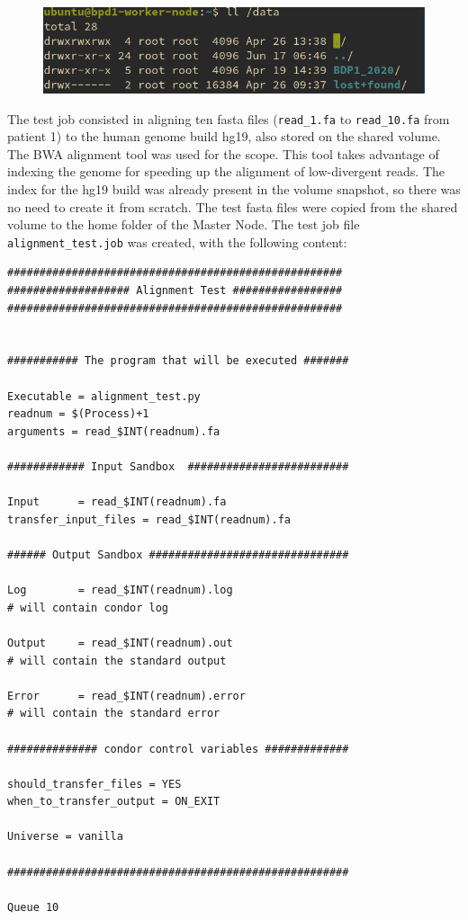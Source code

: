 \documentclass{article}
\begin{document}
\begin{figure}[!h]
    \center
    \includegraphics[width=.8\textwidth]{./images/nfs_bdp_works.png}
\end{figure}

The test job consisted in aligning ten fasta files (\texttt{read\_1.fa} to \texttt{read\_10.fa} from patient 1) to the human genome build hg19, also stored on the shared volume.
The BWA alignment tool was used for the scope.
This tool takes advantage of indexing the genome for speeding up the alignment of low-divergent reads.
The index for the hg19 build was already present in the volume snapshot, so there was no need to create it from scratch.
The test fasta files were copied from the shared volume to the home folder of the Master Node.
The test job file \texttt{alignment\_test.job} was created, with the following content:

\begin{lstlisting}
####################################################
################### Alignment Test #################
####################################################


########### The program that will be executed #######

Executable = alignment_test.py
readnum = $(Process)+1
arguments = read_$INT(readnum).fa

############ Input Sandbox  #########################

Input      = read_$INT(readnum).fa
transfer_input_files = read_$INT(readnum).fa

###### Output Sandbox ###############################

Log        = read_$INT(readnum).log
# will contain condor log

Output     = read_$INT(readnum).out
# will contain the standard output

Error      = read_$INT(readnum).error
# will contain the standard error

############## condor control variables #############

should_transfer_files = YES
when_to_transfer_output = ON_EXIT

Universe = vanilla

#####################################################

Queue 10
\end{lstlisting}
\end{document}
